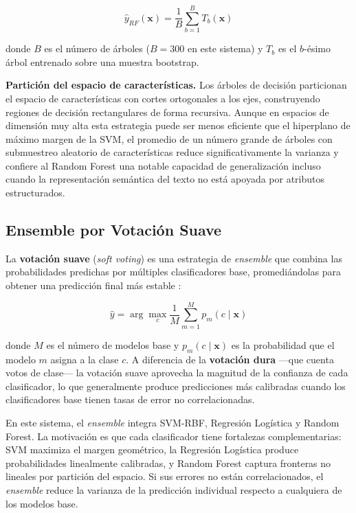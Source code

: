 \begin{equation}
  \hat{y}_{RF}(\mathbf{x})
  = \frac{1}{B} \sum_{b=1}^{B} T_b(\mathbf{x})
  \label{eq:rf}
\end{equation}

donde $B$ es el número de árboles ($B = 300$ en este sistema) y $T_b$ es el
$b$-ésimo árbol entrenado sobre una muestra bootstrap.

\noindent\textbf{Partición del espacio de características.} Los árboles de
decisión particionan el espacio de características con cortes ortogonales a
los ejes, construyendo regiones de decisión rectangulares de forma recursiva.
Aunque en espacios de dimensión muy alta esta estrategia puede ser menos
eficiente que el hiperplano de máximo margen de la SVM, el promedio de un
número grande de árboles con submuestreo aleatorio de características reduce
significativamente la varianza y confiere al Random Forest una notable
capacidad de generalización incluso cuando la representación semántica del
texto no está apoyada por atributos estructurados.

\subsection{Ensemble por Votación Suave}

La \textbf{votación suave} (\textit{soft voting}) es una estrategia de
\textit{ensemble} que combina las probabilidades predichas por múltiples
clasificadores base, promediándolas para obtener una predicción final más
estable \cite{dietterich2000}:

\begin{equation}
  \hat{y} = \arg\max_{c} \frac{1}{M} \sum_{m=1}^{M} p_m(c \mid \mathbf{x})
  \label{eq:soft_voting}
\end{equation}

donde $M$ es el número de modelos base y $p_m(c \mid \mathbf{x})$ es la
probabilidad que el modelo $m$ asigna a la clase $c$. A diferencia de la
\textbf{votación dura} —que cuenta votos de clase— la votación suave aprovecha
la magnitud de la confianza de cada clasificador, lo que generalmente produce
predicciones más calibradas cuando los clasificadores base tienen tasas de error
no correlacionadas.

En este sistema, el \textit{ensemble} integra SVM-RBF, Regresión Logística y
Random Forest. La motivación es que cada clasificador tiene fortalezas
complementarias: SVM maximiza el margen geométrico, la Regresión Logística
produce probabilidades linealmente calibradas, y Random Forest captura fronteras
no lineales por partición del espacio. Si sus errores no están correlacionados,
el \textit{ensemble} reduce la varianza de la predicción individual respecto a
cualquiera de los modelos base.

